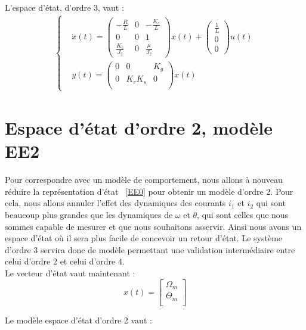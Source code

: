 \noindent L'espace d'état, d'ordre 3, vaut : 
\begin{align}
\label{EE1}
\left\lbrace
\begin{aligned}
&\dot{x}(t) = \begin{pmatrix}
-\frac{R}{L}	& 	     0 &   -\frac{K_e}{L}	\\
0&	0 & 1\\
\frac{K_c}{J_2}	&	0&	\frac{\mu}{J_2}
\end{pmatrix}x(t)+\begin{pmatrix}
\frac{1}{L}\\0\\0
\end{pmatrix}u(t)\\
&y(t) = \begin{pmatrix}
0&		0 & K_g	\\
0&		K_rK_s	&	0\\
\end{pmatrix}x(t)
\end{aligned}
\right.
\end{align}
\section{Espace d'état d'ordre 2, modèle EE2}
Pour correspondre avec un modèle de comportement, nous allons à nouveau réduire la représentation d'état ~\eqref{EE0} pour obtenir un modèle d'ordre 2. Pour cela, nous allons annuler l'effet des dynamiques des courants $i_1$ et $i_2$ qui sont beaucoup plus grandes que les dynamiques de $\omega$ et $\theta$, qui sont celles que nous sommes capable de mesurer et que nous souhaitons asservir. Ainsi nous avons un espace d'état o\`u il sera plus facile de concevoir un retour d'état. Le système d'ordre 3 servira donc de modèle permettant une validation intermédiaire entre celui d'ordre 2 et celui d'ordre 4.\\

\noindent Le vecteur d'état vaut maintenant : \begin{equation}
x(t)=\begin{bmatrix}
\Omega_m\\
\Theta_m\\
\end{bmatrix}
\end{equation}

\noindent Le modèle espace d'état d'ordre 2 vaut :\\

